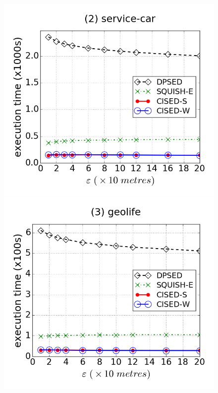 \begin{figure}[tb!]
\centering
\includegraphics[scale = 0.240]{Figures/Exp-time-epsilon-service.png}
\includegraphics[scale = 0.240]{Figures/Exp-time-epsilon-geolife.png}

\end{figure}
